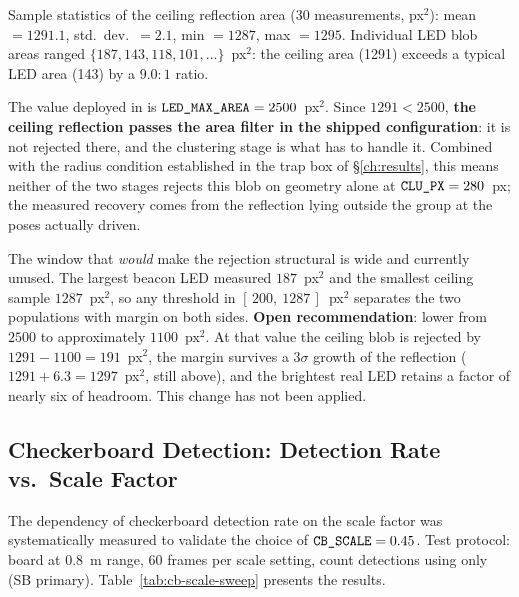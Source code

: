 \begin{eqblock}
Sample statistics of the ceiling reflection area (30 measurements, px$^2$): mean $=1291.1$, std.\ dev.\ $=2.1$, min $=1287$, max $=1295$. Individual LED blob areas ranged $\{187, 143, 118, 101, \dots\}$~px$^2$: the ceiling area (1291) exceeds a typical LED area (143) by a $9.0{:}1$ ratio.

The value deployed in  is
$\code{LED\_MAX\_AREA}=2500$~px$^2$. Since $1291<2500$, \textbf{the ceiling
reflection passes the area filter in the shipped configuration}: it is not
rejected there, and the clustering stage is what has to handle it. Combined
with the radius condition established in the trap box of
\S\ref{ch:results}, this means neither of the two stages rejects this blob
on geometry alone at $\code{CLU\_PX}=280$~px; the measured recovery comes
from the reflection lying outside the group at the poses actually driven.

The window that \emph{would} make the rejection structural is wide and
currently unused. The largest beacon LED measured $187$~px$^2$ and the
smallest ceiling sample $1287$~px$^2$, so any threshold in
$[\,200,\ 1287\,]$~px$^2$ separates the two populations with margin on both
sides. \textbf{Open recommendation}: lower  from $2500$
to approximately $1100$~px$^2$. At that value the ceiling blob is rejected
by $1291-1100=191$~px$^2$, the margin survives a $3\sigma$ growth of the
reflection ($1291+6.3=1297$~px$^2$, still above), and the brightest real LED
retains a factor of nearly six of headroom. This change has not been
applied.
\end{eqblock}

\subsection{Checkerboard Detection: Detection Rate vs.\ Scale Factor}

The dependency of checkerboard detection rate on the scale factor  was systematically measured to validate the choice of $\code{CB\_SCALE}=0.45$. Test protocol: board at 0.8~m range, 60 frames per scale setting, count detections using  only (SB primary). Table~\ref{tab:cb-scale-sweep} presents the results.

